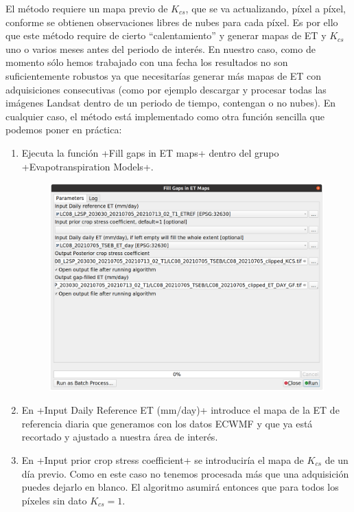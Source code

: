 \documentclass[a4paper,11pt]{article}
\begin{document}
  El método requiere un mapa previo de $K_{cs}$, que se va actualizando, píxel a píxel, conforme se obtienen observaciones libres de nubes para cada píxel. Es por ello que este método require de cierto ``calentamiento'' y generar mapas de ET y $K_{cs}$ uno o varios meses antes del periodo de interés. En nuestro caso, como de momento sólo hemos trabajado con una fecha los resultados no son suficientemente robustos ya que necesitarías generar más mapas de ET con adquisiciones consecutivas (como por ejemplo descargar y procesar todas las imágenes Landsat dentro de un periodo de tiempo, contengan o no nubes). En cualquier caso, el método está implementado como otra función sencilla que podemos poner en práctica:
  
  \begin{enumerate}
   \item Ejecuta la función \cverb+Fill gaps in ET maps+ dentro del grupo \cverb+Evapotranspiration Models+.
   \begin{figure}[H]\centering
    \includegraphics[width=\textwidth]{qgis_et_gap_fill}
   \end{figure}
   
   \item En \cverb+Input Daily Reference ET (mm/day)+ introduce el mapa de la ET de referencia diaria que generamos con los datos ECWMF y que ya está recortado y ajustado a nuestra área de interés.
   
   \item En \cverb+Input prior crop stress coefficient+ se introduciría el mapa de $K_{cs}$ de un día previo. Como en este caso no tenemos procesada más que una adquisición puedes dejarlo en blanco. El algoritmo asumirá entonces que para todos los píxeles sin dato $K_{cs}=1$. 
   

\end{enumerate}
\end{document}
